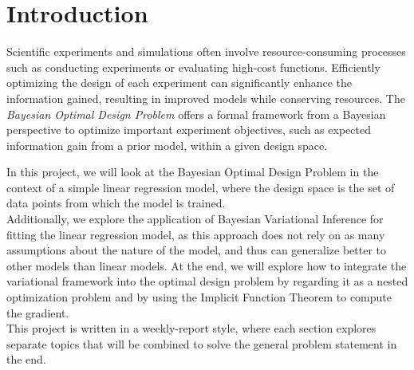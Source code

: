 \section{Introduction}
Scientific experiments and simulations often involve resource-consuming processes such as conducting experiments or evaluating high-cost functions. 
Efficiently optimizing the design of each experiment can significantly enhance the information gained, resulting in improved models while conserving resources. 
The \textit{Bayesian Optimal Design Problem} offers a formal framework from a Bayesian perspective to optimize important experiment objectives, 
such as expected information gain from a prior model, within a given design space.

In this project, we will look at the Bayesian Optimal Design Problem in the context of a simple linear regression model, 
where the design space is the set of data points from which the model is trained.\\
Additionally, we explore the application of Bayesian Variational Inference for fitting the linear regression model, 
as this approach does not rely on as many assumptions about the nature of the model, and thus can generalize better to other models than linear models.
At the end, we will explore how to integrate the variational framework into the optimal design problem
by regarding it as a nested optimization problem and by using the Implicit Function Theorem to compute the gradient.\\
This project is written in a weekly-report style, where each section explores separate topics that will be combined to solve the general problem statement in the end.
